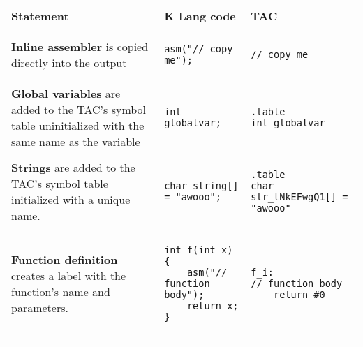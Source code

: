 \begin{tabular}{l l l}
\textbf{Statement} & \textbf{K Lang code} & \textbf{TAC} \\ \\

\parbox{5cm}{\textbf{Inline assembler} is copied directly into the output} &
\begin{lstlisting}
asm("// copy me");
\end{lstlisting} &
\begin{lstlisting}
// copy me
\end{lstlisting} \\ \\

\parbox{5cm}{\textbf{Global variables} are added to the TAC's symbol table uninitialized with the same name as the variable} &
\begin{lstlisting}
int globalvar;
\end{lstlisting} &
\begin{lstlisting}
.table
int globalvar
\end{lstlisting} \\ \\

\parbox{5cm}{\textbf{Strings} are added to the TAC's symbol table initialized with a unique name.} &
\begin{lstlisting}
char string[] = "awooo";
\end{lstlisting} &
\begin{lstlisting}
.table
char str_tNkEFwgQ1[] = "awooo"
\end{lstlisting} \\ \\

\parbox{5cm}{\textbf{Function definition} creates a label with the function's name and parameters.} &
\begin{lstlisting}
int f(int x) {
	asm("// function body");
	return x;
}
\end{lstlisting} &
\begin{lstlisting}
f_i:
// function body
	return #0
\end{lstlisting} \\ \\

\end{tabular}

